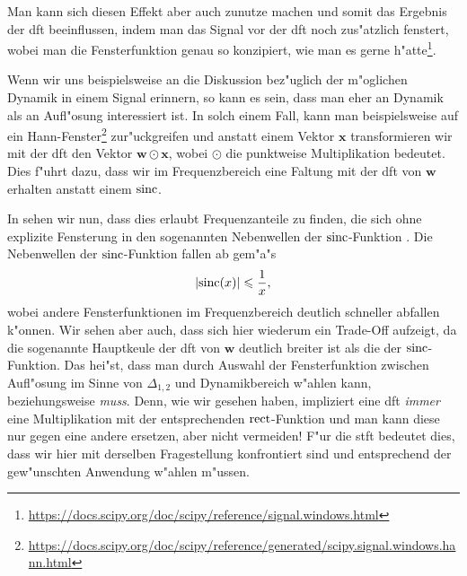 %
%
\clearpage
Man kann sich diesen Effekt aber auch zunutze machen und somit das Ergebnis der \gls{dft} beeinflussen, indem man das Signal vor der \gls{dft} noch zus"atzlich fenstert, wobei man die Fensterfunktion genau so konzipiert, wie man es gerne h"atte\footnote{\url{https://docs.scipy.org/doc/scipy/reference/signal.windows.html}}.

Wenn wir uns beispielsweise an die Diskussion bez"uglich der m"oglichen Dynamik in einem Signal erinnern, so kann es sein, dass man eher an Dynamik als an Aufl"osung interessiert ist.
In solch einem Fall, kann man beispielsweise auf ein Hann-Fenster\footnote{\url{https://docs.scipy.org/doc/scipy/reference/generated/scipy.signal.windows.hann.html}} zur"uckgreifen und anstatt einem Vektor $\bm x$ transformieren wir mit der \gls{dft} den Vektor $\bm w \odot \bm x$, wobei $\odot$ die punktweise Multiplikation bedeutet.
Dies f"uhrt dazu, dass wir im Frequenzbereich eine Faltung mit der \gls{dft} von $\bm w$ erhalten anstatt einem $\operatorname*{sinc}$.

In  sehen wir nun, dass dies erlaubt Frequenzanteile zu finden, die sich ohne explizite Fensterung in den sogenannten Nebenwellen der $\operatorname*{sinc}$-Funktion .
Die Nebenwellen der $\operatorname*{sinc}$-Funktion fallen ab gem"a"s
\[
{\left| \operatorname*{sinc}(x) \right|} \leqslant \frac{1}{x},
\]
wobei andere Fensterfunktionen im Frequenzbereich deutlich schneller abfallen k"onnen.
Wir sehen aber auch, dass sich hier wiederum ein Trade-Off aufzeigt, da die sogenannte Hauptkeule der \gls{dft} von $\bm w$ deutlich breiter ist als die der $\operatorname*{sinc}$-Funktion.
Das hei"st, dass man durch Auswahl der Fensterfunktion zwischen Aufl"osung im Sinne von $\Delta_{1,2}$ und Dynamikbereich w"ahlen kann, beziehungsweise \emph{muss}.
Denn, wie wir gesehen haben, impliziert eine \gls{dft} \emph{immer} eine Multiplikation mit der entsprechenden $\operatorname*{rect}$-Funktion und man kann diese nur gegen eine andere ersetzen, aber nicht vermeiden!
F"ur die \gls{stft} bedeutet dies, dass wir hier  mit derselben Fragestellung konfrontiert sind und entsprechend der gew"unschten Anwendung w"ahlen m"ussen.

